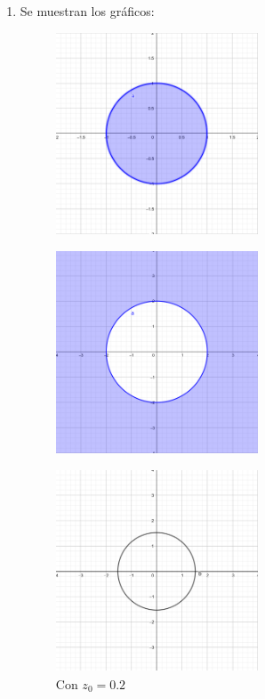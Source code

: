 \documentclass{homework}
\begin{document}
\begin{sol}
    \begin{enumerate}[label=(\alph*)]
        \item Se muestran los gráficos:
            \begin{figure}[H]
                \centering
                \includegraphics[width=6cm, height=6cm]{Circle1a1.png}\caption{}
            \end{figure}
            \begin{figure}[H]
                \centering
                \includegraphics[width=6cm, height=6cm]{Circle1a2.png}\caption{}
            \end{figure}
            \begin{figure}[H]
                \centering
                \includegraphics[width=6cm, height=6cm]{Circle1a3.png}\caption{Con \(z_0=0.2\)}

\end{figure}
\end{enumerate}
\end{sol}
\end{document}
